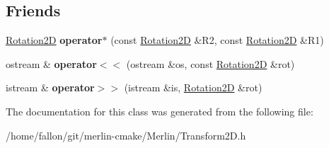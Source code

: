 \subsection*{Friends}
\begin{DoxyCompactItemize}
\item 
\mbox{\label{classRotation2D_a1d87ea840fbe2fd4387f6c09ec1ab355}} 
\hyperlink{classRotation2D}{Rotation2D} {\bfseries operator$\ast$} (const \hyperlink{classRotation2D}{Rotation2D} \&R2, const \hyperlink{classRotation2D}{Rotation2D} \&R1)
\item 
\mbox{\label{classRotation2D_a1050ed7f17f9a8eac24d9ef77c849d7c}} 
ostream \& {\bfseries operator$<$$<$} (ostream \&os, const \hyperlink{classRotation2D}{Rotation2D} \&rot)
\item 
\mbox{\label{classRotation2D_ab5a93aba28aadf88cddd9556104596a5}} 
istream \& {\bfseries operator$>$$>$} (istream \&is, \hyperlink{classRotation2D}{Rotation2D} \&rot)
\end{DoxyCompactItemize}


The documentation for this class was generated from the following file\+:\begin{DoxyCompactItemize}
\item 
/home/fallon/git/merlin-\/cmake/\+Merlin/Transform2\+D.\+h\end{DoxyCompactItemize}
